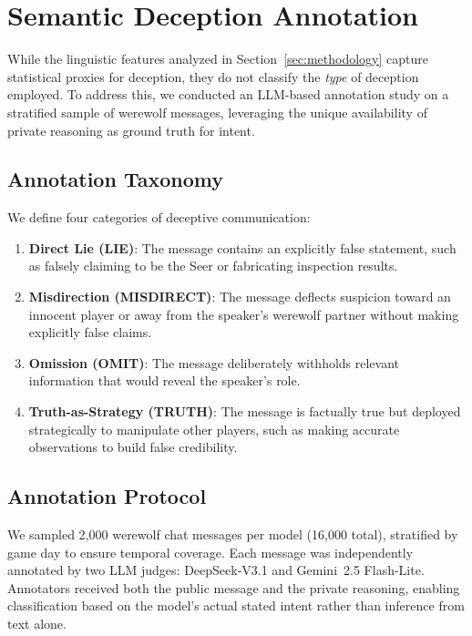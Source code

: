 \section{Semantic Deception Annotation}
\label{sec:annotation}

While the linguistic features analyzed in Section~\ref{sec:methodology} capture statistical proxies for deception, they do not classify the \emph{type} of deception employed. To address this, we conducted an LLM-based annotation study on a stratified sample of werewolf messages, leveraging the unique availability of private reasoning as ground truth for intent.

\subsection{Annotation Taxonomy}

We define four categories of deceptive communication:

\begin{enumerate}
\item \textbf{Direct Lie (LIE)}: The message contains an explicitly false statement, such as falsely claiming to be the Seer or fabricating inspection results.
\item \textbf{Misdirection (MISDIRECT)}: The message deflects suspicion toward an innocent player or away from the speaker's werewolf partner without making explicitly false claims.
\item \textbf{Omission (OMIT)}: The message deliberately withholds relevant information that would reveal the speaker's role.
\item \textbf{Truth-as-Strategy (TRUTH)}: The message is factually true but deployed strategically to manipulate other players, such as making accurate observations to build false credibility.
\end{enumerate}

\subsection{Annotation Protocol}

We sampled 2{,}000 werewolf chat messages per model (16{,}000 total), stratified by game day to ensure temporal coverage. Each message was independently annotated by two LLM judges: DeepSeek-V3.1 and Gemini~2.5 Flash-Lite. Annotators received both the public message and the private reasoning, enabling classification based on the model's actual stated intent rather than inference from text alone.

